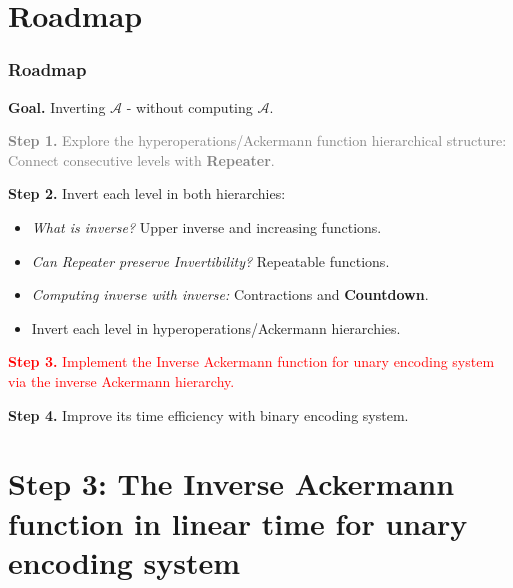 \documentclass[10pt]{beamer}
\newcommand{\Ack}{\ensuremath{\mathcal{A}}}
\begin{document}
\section*{Roadmap}
\begin{frame}
\frametitle{Roadmap}
\textbf{Goal.} Inverting $\Ack$ - without computing $\Ack$.

\bigskip

\textcolor<1-2>{gray}{\textbf{Step 1.} Explore the hyperoperations/Ackermann function hierarchical structure: Connect consecutive levels with \textbf{Repeater}.}

\bigskip

{ \textbf{Step 2.} Invert each level in both hierarchies:
	{ \small
		\begin{itemize}\itemsep0em
			\color<1-2>{gray}
			\item \emph{What is inverse?} Upper inverse and increasing functions.
			\item \emph{Can Repeater preserve Invertibility?} Repeatable functions.
			\item \emph{Computing inverse with inverse:} Contractions and \textbf{Countdown}.
			\item Invert each level in hyperoperations/Ackermann hierarchies.
		\end{itemize}
	}
}

\bigskip

\textcolor<2>{red}{\textbf{Step 3.} Implement the Inverse Ackermann function for unary encoding system via the inverse Ackermann hierarchy.}

\bigskip

\textbf{Step 4.} Improve its time efficiency with binary encoding system.
\end{frame}


\section{Step 3: The Inverse Ackermann function in linear time for unary encoding system}
\label{sec: inv-ack}

\end{document}
